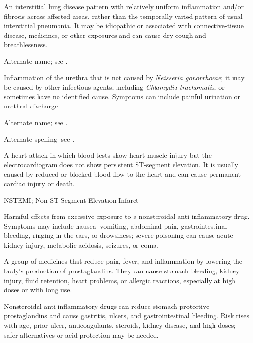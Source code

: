  An interstitial lung disease pattern with relatively uniform inflammation and/or fibrosis across affected areas, rather than the temporally varied pattern of usual interstitial pneumonia. It may be idiopathic or associated with connective-tissue disease, medicines, or other exposures and can cause dry cough and breathlessness.

 Alternate name; see .

 Inflammation of the urethra that is not caused by \textit{Neisseria gonorrhoeae}; it may be caused by other infectious agents, including \textit{Chlamydia trachomatis}, or sometimes have no identified cause. Symptoms can include painful urination or urethral discharge.

 Alternate name; see .

 Alternate spelling; see .

 A heart attack in which blood tests show heart-muscle injury but the electrocardiogram does not show persistent ST-segment elevation. It is usually caused by reduced or blocked blood flow to the heart and can cause permanent cardiac injury or death.

\synonyms
NSTEMI; Non-ST-Segment Elevation Infarct

 Harmful effects from excessive exposure to a nonsteroidal anti-inflammatory drug. Symptoms may include nausea, vomiting, abdominal pain, gastrointestinal bleeding, ringing in the ears, or drowsiness; severe poisoning can cause acute kidney injury, metabolic acidosis, seizures, or coma.

 A group of medicines that reduce pain, fever, and inflammation by lowering the body’s production of prostaglandins. They can cause stomach bleeding, kidney injury, fluid retention, heart problems, or allergic reactions, especially at high doses or with long use.

 Nonsteroidal anti-inflammatory drugs can reduce stomach-protective prostaglandins and cause gastritis, ulcers, and gastrointestinal bleeding. Risk rises with age, prior ulcer, anticoagulants, steroids, kidney disease, and high doses; safer alternatives or acid protection may be needed.

